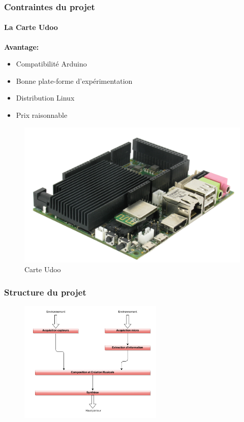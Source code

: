 \documentclass{beamer}
\begin{document}
\begin{frame}
\frametitle{Contraintes du projet}
\framesubtitle{La Carte Udoo}
\begin{minipage}{0.49\textwidth}
\textbf{Avantage:}
\begin{itemize}
\item Compatibilité Arduino
\item Bonne plate-forme d’expérimentation
\item Distribution Linux
\item Prix raisonnable
\end{itemize}
\end{minipage}
\begin{minipage}{0.49\textwidth}
\begin{figure}
  \centering
  \includegraphics[width=\textwidth]{udoo.jpg} 
	\caption{Carte Udoo}
\end{figure}
\end{minipage}
\end{frame}

\begin{frame}
\frametitle{Structure du projet}
\begin{figure}
  \centering
  \includegraphics[height=220px]{structprojet.jpg} 
\end{figure}
\end{frame}
\end{document}
